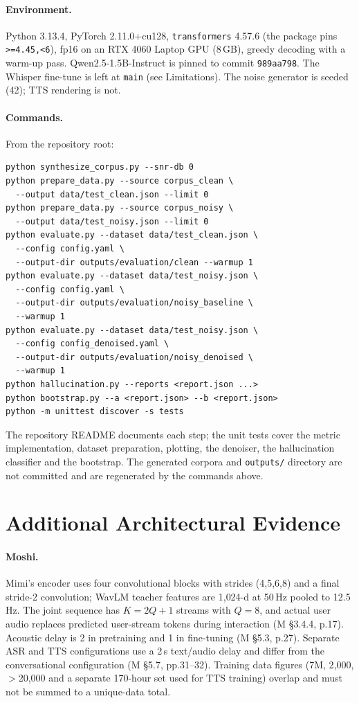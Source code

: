 \documentclass[11pt,a4paper,twocolumn]{article}
\newcommand{\M}{\textsc{M}}
\begin{document}
\paragraph{Environment.} Python 3.13.4, PyTorch 2.11.0+cu128, \texttt{transformers} 4.57.6 (the package pins \texttt{>=4.45,<6}), fp16 on an RTX 4060 Laptop GPU (8\,GB), greedy decoding with a warm-up pass. Qwen2.5-1.5B-Instruct is pinned to commit \texttt{989aa798}. The Whisper fine-tune is left at \texttt{main} (see Limitations). The noise generator is seeded (42); TTS rendering is not.

\paragraph{Commands.} From the repository root:
{\footnotesize
\begin{verbatim}
python synthesize_corpus.py --snr-db 0
python prepare_data.py --source corpus_clean \
  --output data/test_clean.json --limit 0
python prepare_data.py --source corpus_noisy \
  --output data/test_noisy.json --limit 0
python evaluate.py --dataset data/test_clean.json \
  --config config.yaml \
  --output-dir outputs/evaluation/clean --warmup 1
python evaluate.py --dataset data/test_noisy.json \
  --config config.yaml \
  --output-dir outputs/evaluation/noisy_baseline \
  --warmup 1
python evaluate.py --dataset data/test_noisy.json \
  --config config_denoised.yaml \
  --output-dir outputs/evaluation/noisy_denoised \
  --warmup 1
python hallucination.py --reports <report.json ...>
python bootstrap.py --a <report.json> --b <report.json>
python -m unittest discover -s tests
\end{verbatim}}
\noindent The repository README documents each step; the unit tests cover the metric implementation, dataset preparation, plotting, the denoiser, the hallucination classifier and the bootstrap. The generated corpora and \texttt{outputs/} directory are not committed and are regenerated by the commands above.

\section{Additional Architectural Evidence}
\label{app:evidence}

\paragraph{Moshi.} Mimi's encoder uses four convolutional blocks with strides (4,5,6,8) and a final stride-2 convolution; WavLM teacher features are 1{,}024-d at 50\,Hz pooled to 12.5\,Hz. The joint sequence has $K=2Q+1$ streams with $Q=8$, and actual user audio replaces predicted user-stream tokens during interaction (\M{} \S3.4.4, p.17). Acoustic delay is 2 in pretraining and 1 in fine-tuning (\M{} \S5.3, p.27). Separate ASR and TTS configurations use a 2\,s text/audio delay and differ from the conversational configuration (\M{} \S5.7, pp.31--32). Training data figures (7M, 2{,}000, $>$20{,}000 and a separate 170-hour set used for TTS training) overlap and must not be summed to a unique-data total.
\end{document}
